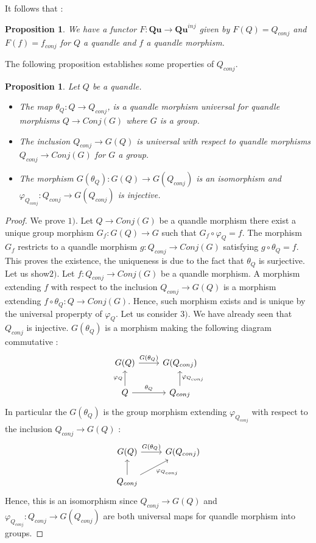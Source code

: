 \documentclass[12pt, reqno]{amsart}
\newtheorem{proposition}[theorem]{Proposition}
\newcommand{\Q}{{\mathbf{Qu}}}
\begin{document}
It follows that :
\begin{proposition}
We have a functor $F:\Q \to \Q^{inj}$ given by $F(Q)=Q_{conj}$ and $F(f)=f_{conj}$ for $Q$ a quandle and $f$ a quandle morphism.
\end{proposition}
The following proposition establishes some properties of $Q_{conj}$.
\begin{proposition}\label{Gcon}
Let $Q$ be a quandle. 
\begin{itemize}
\item[1)] The map $\theta_Q : Q \to Q_{conj}$, is a quandle morphism universal for quandle morphisms $Q\to Conj(G)$ where $G$ is a group.
\item[2)] The inclusion $Q_{conj}\to G(Q)$ is universal with respect to quandle morphisms $Q_{conj}\to Conj(G)$ for $G$ a group.
\item[3)] The morphism $G(\theta_Q) : G(Q) \to G(Q_{conj})$ is an isomorphism and $\varphi_{Q_{conj}} :Q_{conj} \to G({Q_{conj}})$ is injective.  
\end{itemize}
\end{proposition}
\begin{proof}
We prove $1)$. Let $Q\to Conj(G)$ be a quandle morphism there exist a unique group morphism $G_f : G(Q) \to G$ such that $G_f\circ \varphi_Q= f$. The morphism $G_f$ restricts to a quandle morphism  $g :Q_{conj} \to Conj(G)$ satisfying $g\circ \theta_Q=f$. This proves the existence, the uniqueness is due to the fact that $\theta_Q$ is surjective. Let us show$2)$. Let $f:Q_{conj} \to Conj(G)$ be a quandle morphism. A morphism extending $f$ with respect to the inclusion $Q_{conj}\to G(Q)$ is a morphism extending $f\circ \theta_Q : Q\to Conj(G)$. Hence, such morphism exists and is unique by the universal properpty of $\varphi_Q$. Let us consider $3)$. We have already seen that $Q_{conj}$ is injective. $G(\theta_Q)$ is a morphism making the following diagram commutative :
$$\begin{tikzcd}
G(Q) \arrow{r}{G(\theta_Q)} &G(Q_{conj})  \\ 
Q\arrow{u}{\varphi_Q} \arrow{r}{\theta_Q} & Q_{conj}\arrow[swap]{u}{\varphi_{Q_{conj}}} 
\end{tikzcd} $$
In particular the $G(\theta_Q)$ is the group morphism extending $\varphi_{Q_{conj}}$ with respect to the inclusion $Q_{conj}\to G(Q)$ : 
$$\begin{tikzcd}
G(Q) \arrow{r}{G(\theta_Q)} &G(Q_{conj})  \\ 
Q_{conj}\arrow{u} \arrow[swap]{ru}{\varphi_{Q_{conj}}} &  
\end{tikzcd} $$
Hence, this is an isomorphism since $Q_{conj}\to G(Q)$ and $\varphi_{Q_{conj}}:Q_{conj}\to G(Q_{conj})$ are both universal maps for quandle morphism into groups.
\end{proof}
\end{document}
